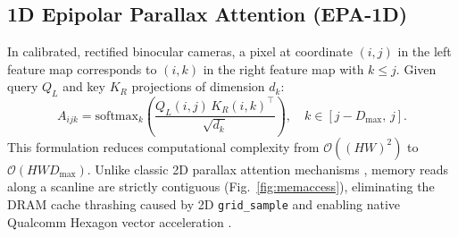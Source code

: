 \documentclass[conference]{IEEEtran}
\begin{document}
\subsection{1D Epipolar Parallax Attention (EPA-1D)}
In calibrated, rectified binocular cameras, a pixel at coordinate $(i, j)$ in the left feature map corresponds to $(i, k)$ in the right feature map with $k \le j$. Given query $Q_L$ and key $K_R$ projections of dimension $d_k$:
\begin{equation}
A_{ijk} = \mathrm{softmax}_k\!\left(\frac{Q_L(i,j)\,K_R(i,k)^{\top}}{\sqrt{d_k}}\right),\quad k \in [j-D_{\max},\,j].
\end{equation}
This formulation reduces computational complexity from $\mathcal{O}((HW)^2)$ to $\mathcal{O}(HWD_{\max})$. Unlike classic 2D parallax attention mechanisms \cite{passr, ipassr, ssrdefnet}, memory reads along a scanline are strictly contiguous (Fig.~\ref{fig:memaccess}), eliminating the DRAM cache thrashing caused by 2D \texttt{grid\_sample} and enabling native Qualcomm Hexagon vector acceleration \cite{qnn_sdk}.
\end{document}
